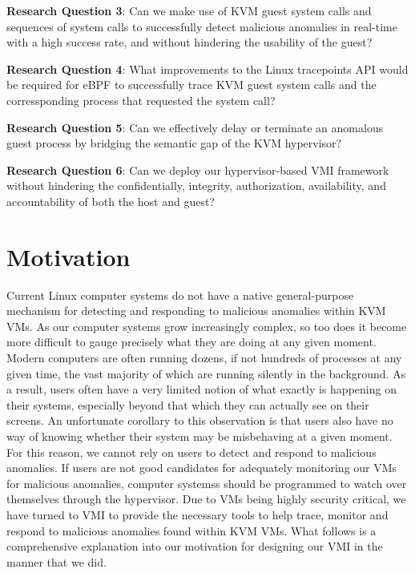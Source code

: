 \documentclass{report}
\begin{document}
\begin{spacing}{1.5}
{\large
\textbf{Research Question 3}: Can we make use of KVM guest system calls and sequences of system calls to successfully detect malicious anomalies in real-time with a high success rate, and without hindering the usability of the guest?
\newline
}


{\large
\textbf{Research Question 4}: What improvements to the Linux tracepoints API would be required for eBPF to successfully trace KVM guest system calls and the corressponding process that requested the system call?
\newline
}

{\large
\textbf{Research Question 5}: Can we effectively delay or terminate an anomalous guest process by bridging the semantic gap of the KVM hypervisor?
\newline
}

{\large
\textbf{Research Question 6}: Can we deploy our hypervisor-based VMI framework without hindering the confidentially, integrity, authorization, availability, and accountability of both the host and guest?  
\newline
}









\section{Motivation}
{\large
Current Linux computer systems do not have a native general-purpose mechanism for detecting and responding to malicious anomalies within KVM VMs. As our computer systems grow increasingly complex, so too does it become more difficult to gauge precisely what they are doing at any given moment. Modern computers are often running dozens, if not hundreds of processes at any given time, the vast majority of which are running silently in the background. As a result, users often have a very limited notion of what exactly is happening on their systems, especially beyond that which they can actually see on their screens. An unfortunate corollary to this observation is that users also have no way of knowing whether their system may be misbehaving at a given moment. For this reason, we cannot rely on users to detect and respond to malicious anomalies. If users are not good candidates for adequately monitoring our VMs for malicious anomalies, computer systemss should be programmed to watch over themselves through the hypervisor. Due to VMs being highly security critical, we have turned to VMI to provide the necessary tools to help trace, monitor and respond to malicious anomalies found within KVM VMs. What follows is a comprehensive explanation into our motivation for designing our VMI in the manner that we did.
\newline
}









\end{spacing}
\end{document}
